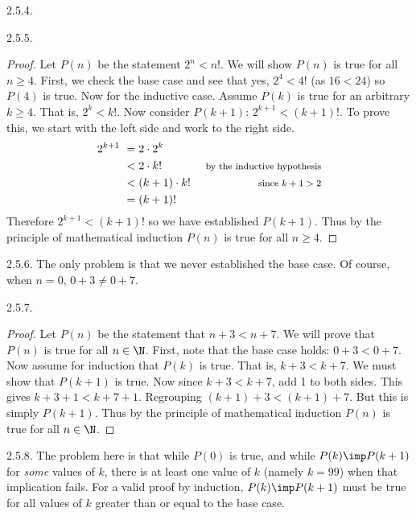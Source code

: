 \begin {itemize}
\begin{ans}{2.5.4.}
\end{ans}
\begin{ans}{2.5.5.}
		\begin{proof}
		 Let $P(n)$ be the statement $2^n < n!$.  We will show $P(n)$ is true for all $n \ge 4$.  First, we check the base case and see that yes, $2^4 < 4!$ (as $16 < 24$) so $P(4)$ is true.  Now for the inductive case.  Assume $P(k)$ is true for an arbitrary $k \ge 4$.  That is, $2^k < k!$.  Now consider $P(k+1)$: $2^{k+1} < (k+1)!$.  To prove this, we start with the left side and work to the right side.
		 \begin{align*}
		  2^{k+1}~ & = 2\cdot 2^k & \\
		  & < 2\cdot k! & \mbox{ \footnotesize by the inductive hypothesis}\\
		  & < (k+1) \cdot k! & \mbox{ \footnotesize since $k+1 > 2$}\\
		  & = (k+1)! &
		 \end{align*}
		Therefore $2^{k+1} < (k+1)!$ so we have established $P(k+1)$.  Thus by the principle of mathematical induction $P(n)$ is true for all $n \ge 4$.
		\end{proof}
	
\end{ans}
\begin{ans}{2.5.6.}
  		The only problem is that we never established the base case.  Of course, when $n = 0$, $0+3 \ne 0+7$.
  	
\end{ans}
\begin{ans}{2.5.7.}
		\begin{proof}
		    Let $P(n)$ be the statement that $n + 3 < n + 7$.  We will prove that $P(n)$ is true for all $n \in \N$.  First, note that the base case holds: $0+3 < 0+7$.  Now assume for induction that $P(k)$ is true.  That is, $k+3 < k+7$.  We must show that $P(k+1)$ is true.  Now since $k + 3 < k + 7$, add 1 to both sides.  This gives $k + 3 + 1 < k + 7 + 1$.  Regrouping $(k+1) + 3 < (k+1) + 7$.  But this is simply $P(k+1)$.  Thus by the principle of mathematical induction $P(n)$ is true for all $n \in \N$.
		\end{proof}
	
\end{ans}
\begin{ans}{2.5.8.}
 		The problem here is that while $P(0)$ is true, and while $P(k) \imp P(k+1)$ for {\em some} values of $k$, there is at least one value of $k$ (namely $k = 99$) when that implication fails.  For a valid proof by induction, $P(k) \imp P(k+1)$ must be true for all values of $k$ greater than or equal to the base case.
 	

\end{ans}
\end{itemize}
